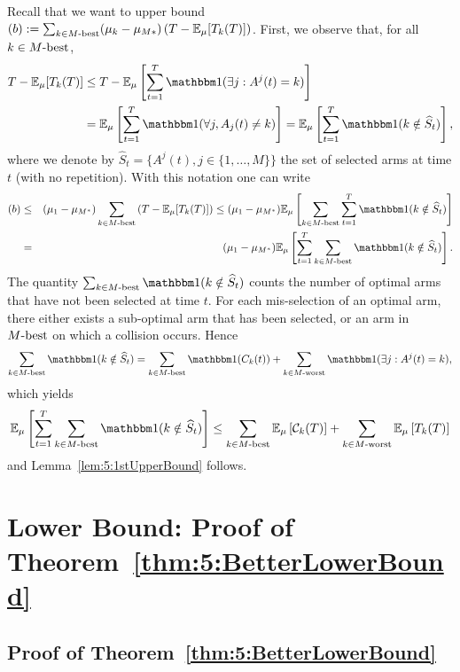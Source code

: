 Recall that we want to upper bound
$ (b) : = \sum_{k \in M\text{-}\mathrm{best}} (\mu_k - \mu_{M*}) \left(T - \mathbb{E}_{\mu}[T_k(T)]\right)$.
First, we observe that, for all $k\in M\text{-}\mathrm{best}$,
\begin{eqnarray*}
  T - \E_{\mu}[T_k(T)] & \leq T - \E_{\mu}\left[\sum_{t=1}^T \indic(\exists j : A^j(t) = k)\right] \\
  & = \E_{\mu}\left[\sum_{t=1}^T \indic(\forall j, A_j(t) \neq k)\right] = \E_{\mu}\left[\sum_{t=1}^T \indic(k \notin \widehat{S}_t)\right],
\end{eqnarray*}
where we denote by $\widehat{S}_t = \{A^j(t), j \in \{1,\dots,M\}\}$ the set of selected arms at time $t$ (with no repetition). With this notation one can write
\begin{eqnarray*}
 (b) & \leq & (\mu_1 - \mu_{M^*})  \sum_{k \in \Mbest} \left(T - \E_{\mu}[T_k(T)]\right) \leq  (\mu_1 - \mu_{M^*})  \E_{\mu}\left[\sum_{k \in \Mbest} \sum_{t = 1}^T \indic(k \notin \widehat{S}_t)\right] \\
 & = &  (\mu_1 - \mu_{M^*})  \E_{\mu}\left[ \sum_{t = 1}^T \sum_{k \in \Mbest}\indic(k \notin \widehat{S}_t)\right].
\end{eqnarray*}
The quantity $\sum_{k \in \Mbest}\indic(k \notin \widehat{S}_t)$ counts the number of optimal arms that have not been selected at time $t$. For each mis-selection of an optimal arm, there either exists a sub-optimal arm that has been selected, or an arm in $M\text{-}\mathrm{best}$ on which a collision occurs. Hence
\[\sum_{k \in \Mbest}\indic(k \notin \widehat{S}_t) = \sum_{k \in \Mbest}\indic(C_k(t)) + \sum_{k \in \Mworst} \indic(\exists j : A^j(t) = k),\]
which yields
\[\E_{\mu}\left[ \sum_{t = 1}^T \sum_{k \in \Mbest}\indic(k \notin \widehat{S}_t)\right] \leq \sum_{k \in \Mbest}\E_{\mu}\left[\cC_k(T)\right] + \sum_{k \in \Mworst} \E_{\mu}\left[T_k(T)\right]\]
and Lemma~\ref{lem:5:1stUpperBound} follows.


\section{Lower Bound: Proof of Theorem~\ref{thm:5:BetterLowerBound}}
\label{proof:5:BetterLowerBound}



\subsection{Proof of Theorem~\ref{thm:5:BetterLowerBound}}

